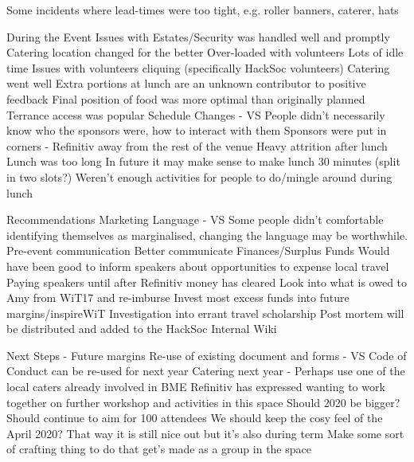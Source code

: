 \documentclass[11pt]{meetingmins}
\begin{document}
\begin{items}
		\subitem Some incidents where lead-times were too tight, e.g. roller banners, caterer, hats
	\item During the Event
		\subitem Issues with Estates/Security was handled well and promptly
			\subsubitem Catering location changed for the better
		\subitem Over-loaded with volunteers
			\subsubitem Lots of idle time
			\subsubitem Issues with volunteers cliquing (specifically HackSoc volunteers)
		\subitem Catering went well
			\subsubitem Extra portions at lunch are an unknown contributor to positive feedback
			\subsubitem Final position of food was more optimal than originally planned
		\subitem Terrance access was popular
		\subitem Schedule Changes - VS
		\subitem People didn't necessarily know who the sponsors were, how to interact with them
			\subsubitem Sponsors were put in corners - Refinitiv away from the rest of the venue
		\subitem Heavy attrition after lunch
			\subsubitem Lunch was too long
			\subsubitem In future it may make sense to make lunch 30 minutes (split in two slots?)
			\subsubitem Weren't enough activities for people to do/mingle around during lunch
	\item Recommendations
		\subitem Marketing Language - VS
			\subsubitem Some people didn't comfortable identifying themselves as marginalised, changing the language may be worthwhile.
		\subitem Pre-event communication
			\subsubitem Better communicate 
		\subitem Finances/Surplus Funds
			\subsubitem Would have been good to inform speakers about opportunities to expense local travel
			\subsubitem Paying speakers until after Refinitiv money has cleared
			\subsubitem Look into what is owed to Amy from WiT17 and re-imburse
			\subsubitem Invest most excess funds into future margins/inspireWiT
		\subitem Investigation into errant travel scholarship
			\subsubitem Post mortem will be distributed and added to the HackSoc Internal Wiki
	\item Next Steps - Future margins
		\subitem Re-use of existing document and forms - VS
			\subsubitem Code of Conduct can be re-used for next year
		\subitem Catering next year - Perhaps use one of the local caters already involved in BME
		\subitem Refinitiv has expressed wanting to work together on further workshop and activities in this space
		\subitem Should 2020 be bigger?
			\subsubitem Should continue to aim for 100 attendees
			\subsubitem We should keep the cosy feel of the
		\subitem April 2020? That way it is still nice out but it's also during term
		\subitem Make some sort of crafting thing to do that get's made as a group in the space

\end{items}
\end{document}
